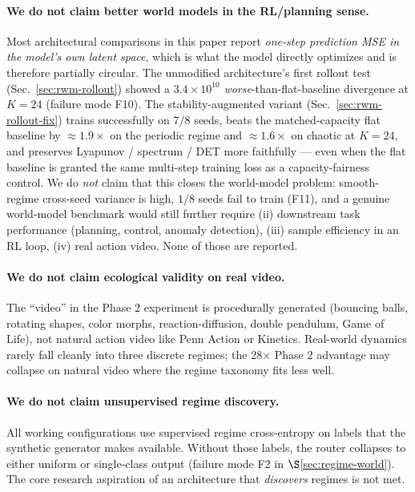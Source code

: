 \documentclass[11pt,a4paper]{article}
\begin{document}
\paragraph{We do not claim better world models in the
RL/planning sense.} Most architectural comparisons in this paper
report \emph{one-step prediction MSE in the model's own latent space},
which is what the model directly optimizes and is therefore partially
circular. The unmodified architecture's first rollout test
(Sec.~\ref{sec:rwm-rollout}) showed a $3.4{\times}10^{10}$
\emph{worse}-than-flat-baseline divergence at $K{=}24$ (failure mode
F10). The stability-augmented variant
(Sec.~\ref{sec:rwm-rollout-fix}) trains successfully on $7/8$ seeds,
beats the matched-capacity flat baseline by $\approx 1.9{\times}$
on the periodic regime and $\approx 1.6{\times}$ on chaotic at
$K{=}24$, and preserves Lyapunov / spectrum / DET more faithfully ---
even when the flat baseline is granted the same multi-step training
loss as a capacity-fairness control. We do \emph{not} claim that this
closes the world-model problem: smooth-regime cross-seed variance is
high, $1/8$ seeds fail to train (F11), and a genuine world-model
benchmark would still further require (ii) downstream task performance
(planning, control, anomaly detection), (iii) sample efficiency in
an RL loop, (iv) real action video. None of those are reported.

\paragraph{We do not claim ecological validity on real video.} The
``video'' in the Phase 2 experiment is procedurally generated
(bouncing balls, rotating shapes, color morphs, reaction-diffusion,
double pendulum, Game of Life), not natural action video like Penn
Action or Kinetics. Real-world dynamics rarely fall cleanly into
three discrete regimes; the 28$\times$ Phase 2 advantage may collapse
on natural video where the regime taxonomy fits less well.

\paragraph{We do not claim unsupervised regime discovery.} All
working configurations use supervised regime cross-entropy on labels
that the synthetic generator makes available. Without those labels,
the router collapses to either uniform or single-class output (failure
mode F2 in $\S$\ref{sec:regime-world}). The core research aspiration
of an architecture that \emph{discovers} regimes is not met.
\end{document}

